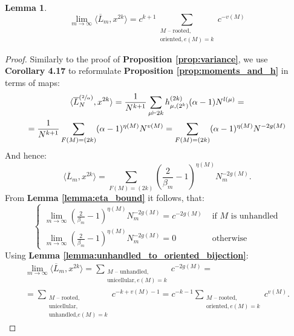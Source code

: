 \documentclass{article}
\newtheorem{lemma}{Lemma}
\begin{document}
\begin{lemma}\label{lemma:moments_as_polynomial_in_c}
\begin{equation}
    \lim\limits_{m \to \infty}\langle \overline{L}_m, x^{2k} \rangle = c^{k + 1}\sum\limits_{\substack{\text{$M$ -- rooted, } \\ \text{oriented}, e(M) = k}}c^{-v(M)}
\end{equation}
\end{lemma}
\begin{proof}
    Similarly to the proof of \textbf{Proposition \ref{prop:variance}}, we use \cite{lacroix} \textbf{Corollary 4.17} to reformulate \textbf{Proposition \ref{prop:moments_and_h}} in terms of maps:
    \begin{multline}        
        \langle \overline{L}_{N}^{(\sfrac{2}{\alpha})}, x^{2k} \rangle = \frac{1}{N^{k + 1}}\sum\limits_{\mu \vdash 2k}h_{\mu, (2^k)}^{(2k)}(\alpha - 1)N^{l(\mu)} = \\
        = \frac{1}{N^{k + 1}}\sum\limits_{\substack{F(M) = (2k)}}(\alpha - 1)^{\eta(M)}N^{v(M)} = \sum\limits_{\substack{F(M) = (2k)}}(\alpha - 1)^{\eta(M)}N^{-2g(M)}
    \end{multline}
    And hence:
    $$ 
        \langle \overline{L}_m, x^{2k} \rangle = \sum\limits_{F(M) = (2k)}\left(\frac{2}{\beta_m} - 1\right)^{\eta(M)}N_m^{-2g(M)}.
    $$
    From \textbf{Lemma \ref{lemma:eta_bound}} it follows, that:
    $$
    \begin{cases}
        \lim\limits_{m \to \infty}\left(\frac{2}{\beta_m} - 1\right)^{\eta(M)}N_m^{-2g(M)} = c^{-2g(M)} & \text{ if $M$ is unhandled} \\
        \lim\limits_{m \to \infty}\left(\frac{2}{\beta_m} - 1\right)^{\eta(M)}N_m^{-2g(M)} = 0 & \text{ otherwise }
    \end{cases}
    $$
    Using \textbf{Lemma \ref{lemma:unhandled_to_oriented_bijection}}:
    \begin{multline*}
        \lim\limits_{m \to \infty}\langle \overline{L}_m, x^{2k} \rangle = \sum\limits_{ \substack{ M  \text{ -- unhandled}, \\ \text{unicellular}, e(M) = k}}c^{-2g(M)} = \\ = \sum\limits_{\substack{\text{$M$ -- rooted, } \\ \text{unicellular,} \\ \text{unhandled,} e(M) = k}}c^{-k + v(M) - 1} = c^{-k - 1}\sum\limits_{\substack{\text{$M$ -- rooted, } \\ \text{oriented}, e(M) = k}}c^{v(M)}.
    \end{multline*}
\end{proof}
\end{document}
